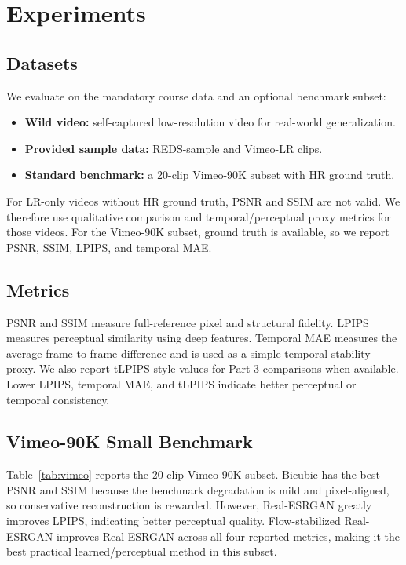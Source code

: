 \documentclass[10pt,twocolumn,letterpaper]{article}
\begin{document}
\section{Experiments}

\subsection{Datasets}

We evaluate on the mandatory course data and an optional benchmark subset:

\begin{itemize}
    \item \textbf{Wild video:} self-captured low-resolution video for real-world generalization.
    \item \textbf{Provided sample data:} REDS-sample and Vimeo-LR clips.
    \item \textbf{Standard benchmark:} a 20-clip Vimeo-90K subset with HR ground truth.
\end{itemize}

For LR-only videos without HR ground truth, PSNR and SSIM are not valid. We therefore use qualitative comparison and temporal/perceptual proxy metrics for those videos. For the Vimeo-90K subset, ground truth is available, so we report PSNR, SSIM, LPIPS, and temporal MAE.

\subsection{Metrics}

PSNR and SSIM measure full-reference pixel and structural fidelity. LPIPS measures perceptual similarity using deep features. Temporal MAE measures the average frame-to-frame difference and is used as a simple temporal stability proxy. We also report tLPIPS-style values for Part 3 comparisons when available. Lower LPIPS, temporal MAE, and tLPIPS indicate better perceptual or temporal consistency.

\subsection{Vimeo-90K Small Benchmark}

Table~\ref{tab:vimeo} reports the 20-clip Vimeo-90K subset. Bicubic has the best PSNR and SSIM because the benchmark degradation is mild and pixel-aligned, so conservative reconstruction is rewarded. However, Real-ESRGAN greatly improves LPIPS, indicating better perceptual quality. Flow-stabilized Real-ESRGAN improves Real-ESRGAN across all four reported metrics, making it the best practical learned/perceptual method in this subset.
\end{document}
